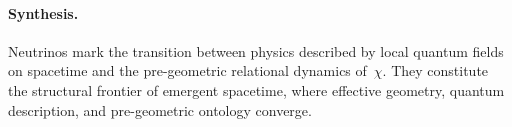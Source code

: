 \paragraph{Synthesis.}
\label{subsec:synthesis-neutrinos-structural-frontier}
Neutrinos mark the transition between physics described by local quantum
fields on spacetime and the pre-geometric relational dynamics of~$\chi$.
They constitute the structural frontier of emergent spacetime, where
effective geometry, quantum description, and pre-geometric ontology
converge.
